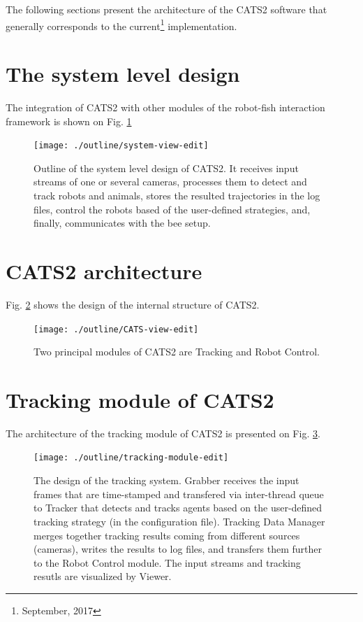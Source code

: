 \documentclass{styles/assisi}
\begin{document}
The following sections present the architecture of the CATS2 software that generally corresponds to the current\footnote{September, 2017} implementation.

\section {The system level design}
The integration of CATS2 with other modules of the robot-fish interaction framework is shown on Fig. \ref{fig:system-level}

\begin{figure}[ht]
\centering
\texttt{[image: ./outline/system-view-edit]}
\caption{Outline of the system level design of CATS2. It receives input streams of one or several cameras, processes them to detect and track robots and animals, stores the resulted trajectories in the log files, control the robots based of the user-defined strategies, and, finally, communicates with the bee setup.}
\label{fig:system-level}
\end{figure}

\section {CATS2 architecture}
Fig. \ref{fig:CATS2-modules} shows the design of the internal structure of CATS2.

\begin{figure}[h]
\centering
\texttt{[image: ./outline/CATS-view-edit]}
\caption{Two principal modules of CATS2 are Tracking and Robot Control.}
\label{fig:CATS2-modules}
\end{figure}

\section {Tracking module of CATS2}
The architecture of the tracking module of CATS2 is presented on Fig. \ref{fig:CATS2-tracking-module}.

\begin{figure}[h]
\centering
\texttt{[image: ./outline/tracking-module-edit]}
\caption{The design of the tracking system. Grabber receives the input frames that are time-stamped and transfered via inter-thread queue to Tracker that detects and tracks agents based on the user-defined tracking strategy (in the configuration file). Tracking Data Manager merges together tracking results coming from different sources (cameras), writes the results to log files, and transfers them further to the Robot Control module. The input streams and tracking resutls are visualized by Viewer.}
\label{fig:CATS2-tracking-module}
\end{figure}
\end{document}
